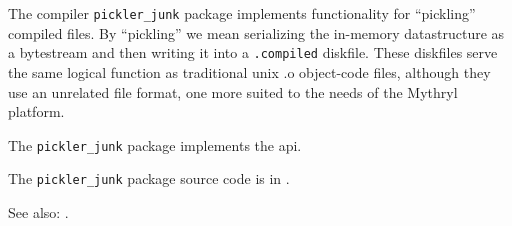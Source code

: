 

The compiler {\tt pickler\_junk} package implements functionality for ``pickling'' compiled files. 
By ``pickling'' we mean serializing the in-memory datastructure as a bytestream 
and then writing it into a {\tt .compiled} diskfile.  These diskfiles serve the same logical function 
as traditional unix {.o} object-code files, although they use an unrelated file format, one more 
suited to the needs of the Mythryl platform.

The {\tt pickler\_junk} package implements the  api.

The {\tt pickler\_junk} package source code is in .

See also: .

